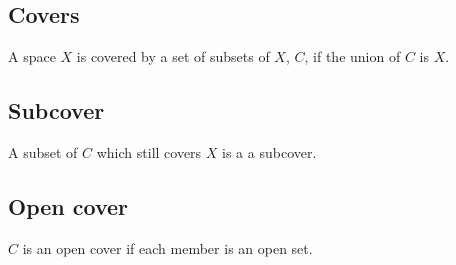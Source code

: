 
\subsection{Covers}

A space \(X\) is covered by a set of subsets of \(X\), \(C\), if the union of \(C\) is \(X\).

\subsection{Subcover}

A subset of \(C\) which still covers \(X\) is a a subcover.

\subsection{Open cover}

\(C\) is an open cover if each member is an open set.

